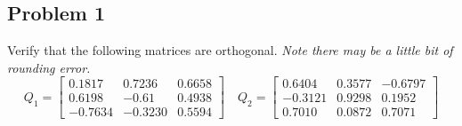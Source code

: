 \documentclass[12pt]{article}
\begin{document}
\newpage
\subsection*{Problem 1} Verify that the following matrices are orthogonal. {\em Note there may be a little bit of rounding error.} \\
$$
Q_1 = \left[\begin{matrix} 0.1817 & 0.7236 & 0.6658 \\ 0.6198 & -0.61 & 0.4938 \\ -0.7634 & -0.3230 & 0.5594 \end{matrix}\right] \quad Q_2 = \left[\begin{matrix} 0.6404 & 0.3577 & -0.6797 \\ -0.3121 & 0.9298 & 0.1952 \\ 0.7010 & 0.0872 & 0.7071 \end{matrix}\right]
$$
\end{document}

